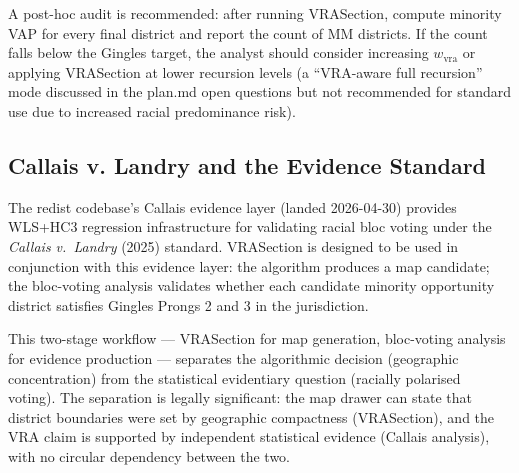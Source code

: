 A post-hoc audit is recommended: after running VRASection, compute
minority VAP for every final district and report the count of MM districts.
If the count falls below the Gingles target, the analyst should consider
increasing $w_\text{vra}$ or applying VRASection at lower recursion levels
(a ``VRA-aware full recursion'' mode discussed in the plan.md open questions
but not recommended for standard use due to increased racial predominance risk).

\subsection{Callais v. Landry and the Evidence Standard}

The redist codebase's Callais evidence layer (landed 2026-04-30) provides
WLS+HC3 regression infrastructure for validating racial bloc voting
under the \emph{Callais v.\ Landry} (2025) standard.
VRASection is designed to be used in conjunction with this evidence layer:
the algorithm produces a map candidate; the bloc-voting analysis validates
whether each candidate minority opportunity district satisfies Gingles
Prongs 2 and 3 in the jurisdiction.

This two-stage workflow --- VRASection for map generation, bloc-voting
analysis for evidence production --- separates the algorithmic decision
(geographic concentration) from the statistical evidentiary question
(racially polarised voting).
The separation is legally significant: the map drawer can state that
district boundaries were set by geographic compactness (VRASection),
and the VRA claim is supported by independent statistical evidence
(Callais analysis), with no circular dependency between the two.
